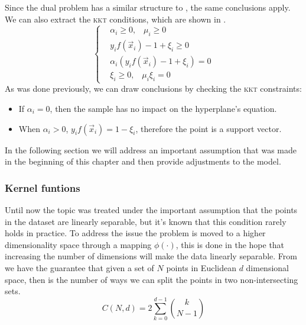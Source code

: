 Since the dual problem has a similar structure to , the same conclusions apply. We can
also extract the \textsc{kkt} conditions, which are shown in .
\begin{equation}
	\label{eq:sm-kkt}
	\begin{cases}
		 & \alpha_i \geq 0, \hspace{10pt}\mu_i \geq 0 \\
		 & y_if(\vec{x}_i) - 1 + \xi_i \geq 0         \\
		 & \alpha_i(y_if(\vec{x}_i) - 1 + \xi_i) = 0  \\
		 & \xi_i \geq 0, \hspace{10pt} \mu_i\xi_i = 0
	\end{cases}
\end{equation}
As was done previously, we can draw conclusions by checking the \textsc{kkt} constraints:
\begin{itemize}
	\item If $\alpha_i = 0$, then the sample has no impact on the hyperplane's equation.
	\item When $\alpha_i > 0$, $y_if(\vec{x}_i) = 1 - \xi_i$, therefore the point is a
		support vector.
\end{itemize}

In the following section we will address an important assumption that was made in the beginning of
this chapter and then provide adjustments to the model.

\subsubsection{Kernel funtions}
\label{sssec:kernel-functions}
Until now the topic was treated under the important assumption that the points in the dataset are
linearly separable, but it's known that this condition rarely holds in practice. To address the issue the
problem is moved to a higher dimensionality space through a mapping $\phi(\cdot)$, this is done in
the hope that increasing the number of dimensions will make the data linearly separable.
From \cite{cover1965} we have the guarantee that given a set of $N$ points in Euclidean $d$
dimensional space, then  is the number of ways we can split the points in two
non-intersecting sets.
\begin{equation}
	\label{eq:dichotomies}
	C(N, d) = 2 \sum_{k = 0}^{d - 1}\binom{k}{N - 1}
\end{equation}

